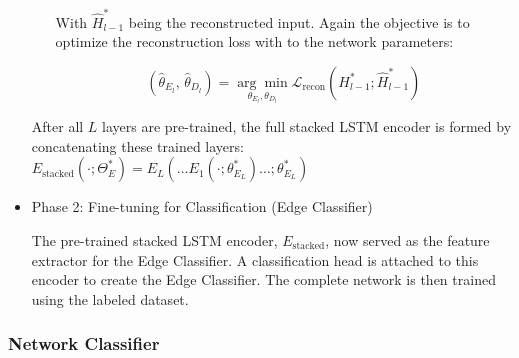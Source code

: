 \begin{itemize}
\begin{itemize}
      With \(\hat H^*_{l-1}\) being the reconstructed input. Again the objective is to optimize the reconstruction loss with to the network parameters:

      \[(\hat \theta_{E_l},\,\hat \theta_{D_l}) = \underset{\theta_{E_l}, \theta_{D_l}} {\arg\min} \mathcal L_{\text{recon}}(H^*_{l-1}; \hat H^*_{l-1})\]
  \end{itemize}
  After all \(L\) layers are pre-trained, the full stacked LSTM encoder is formed by concatenating these trained layers: \(E_\text{stacked}(\cdot; \Theta^*_{E}) = E_L(\ldots E_1(\cdot; \theta^*_{E_L}) \ldots;\theta^*_{E_L})\)
  
  \item Phase 2: Fine-tuning for Classification (Edge Classifier)

  The pre-trained stacked LSTM encoder, \(E_\text{stacked}\), now served as the feature extractor for the Edge Classifier. A classification head is attached to this encoder to create the Edge Classifier. The complete network is then trained using the labeled dataset.
\end{itemize}

\subsubsection{Network Classifier}
